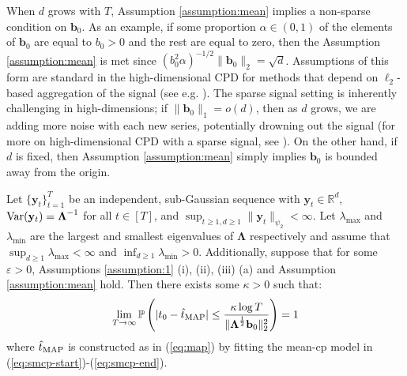 When $d$ grows with $T$, Assumption \ref{assumption:mean} implies a non-sparse condition on $\mathbf{b}_0$. As an example, if some proportion $\alpha \in (0,1)$ of the elements of $\mathbf{b}_0$ are equal to $b_0 > 0$ and the rest are equal to zero, then the Assumption \ref{assumption:mean} is met since $(b^2_0\alpha)^{-1/2}\lVert \mathbf{b}_0 \rVert_2 = \sqrt{d}$. Assumptions of this form are standard in the high-dimensional CPD for methods that depend on $\ell_2$-based aggregation of the signal (see e.g. \citealp{Bai10, Horváth12, Li23}). The sparse signal setting is inherently challenging in high-dimensions; if $\lVert \mathbf{b}_0\rVert_1 = o(d)$, then as $d$ grows, we are adding more noise with each new series, potentially drowning out the signal (for more on high-dimensional CPD with a sparse signal, see \citealp{Cho15, Jirak15, Wang17, Yu21, Chen22}). On the other hand, if $d$ is fixed, then Assumption \ref{assumption:mean} simply implies $\mathbf{b}_0$ is bounded away from the origin.

\begin{theorem}\label{theorem:smcp}
    Let $\{\mathbf{y}_t\}_{t=1}^T$ be an independent, sub-Gaussian sequence with $\mathbf{y}_t \in \mathbb{R}^d$, $\normalfont{\Var}(\mathbf{y}_t) = \boldsymbol{\Lambda}^{-1}$ for all $t \in [T]$, and $\sup_{t \geq 1, d \geq 1} \lVert \mathbf{y}_t\rVert_{\psi_2} < \infty$. Let $\lambda_{\max}$ and $\lambda_{\min}$ are the largest and smallest eigenvalues of $\boldsymbol{\Lambda}$ respectively and assume that $\sup_{d\geq 1}  \lambda_{\max} < \infty$ and $\inf_{d\geq 1} \lambda_{\min} > 0$. Additionally, suppose that for some $\varepsilon >0$, Assumptions \ref{assumption:1} (i), (ii), (iii) (a) and Assumption \ref{assumption:mean} hold. Then there exists some $\kappa > 0$ such that:
    \vspace{-5pt}
    \begin{align*}
        \lim_{T\to\infty}\Pr\left(|t_0 - \hat{t}_{\normalfont \text{MAP}}| \leq \frac{\kappa \log T}{\lVert\boldsymbol{\Lambda}^{\frac{1}{2}}\mathbf{b}_0\rVert_2^2}\right) = 1  
    \end{align*}
    where $\hat{t}_{\normalfont \text{MAP}}$ is constructed as in (\ref{eq:map}) by fitting the mean-cp model in (\ref{eq:smcp-start})-(\ref{eq:smcp-end}). 
\end{theorem}
\vspace{-10pt}

